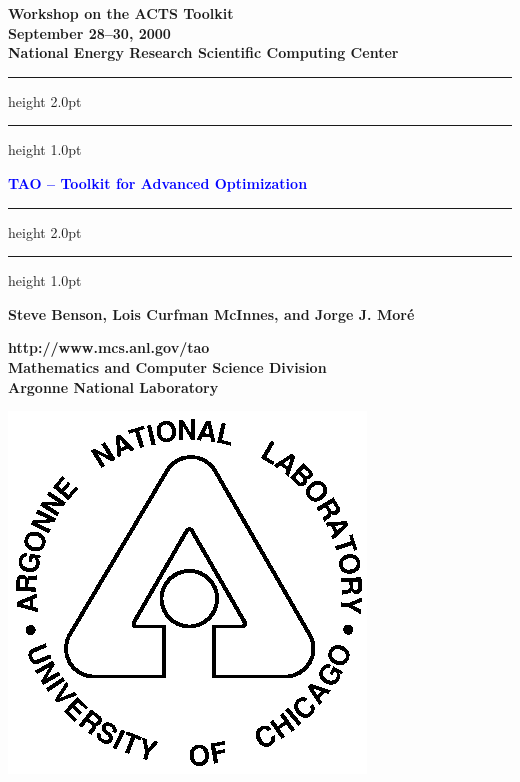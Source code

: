 \documentclass{seminar}
\newcommand{\SlideColours}[3]{%
\slideframe[\psset{linecolor=#1,fillcolor=#3,fillstyle=solid}]{none}%
\color{#2}}
\newcommand{\redstripe}{\textcolor{BrickRed}{\hrule height 2.0pt\hfil}
             \vspace{-1.8pt}
             \textcolor{BrickRed}{\hrule height 1.0pt\hfil}
}
\begin{document}

\begin{slide}

\begin{center}
{\bf
Workshop on the ACTS Toolkit \\
September 28--30, 2000 \\
National Energy Research Scientific Computing Center
}
\end{center}

\redstripe

\begin{center}
{\bf
\textcolor{Blue}{TAO -- Toolkit for Advanced Optimization}
}

\redstripe

\medskip

\centerline{\bf Steve Benson, Lois Curfman McInnes, and Jorge J. Mor\'e}

\end{center}


\parbox[b]{3in}{\bf http://www.mcs.anl.gov/tao \bigskip \\
\small  Mathematics and Computer Science Division \\ 
Argonne National Laboratory} \includegraphics[scale=0.5]{../images//argonne.ps}

\end{slide}
\end{document}
